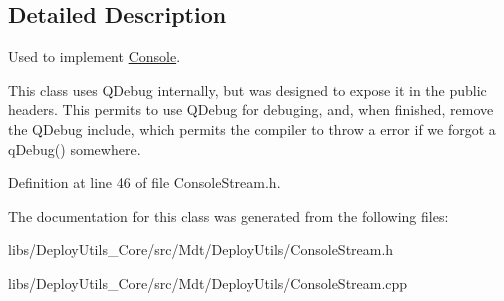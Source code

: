 \subsection{Detailed Description}
Used to implement \hyperlink{class_mdt_1_1_deploy_utils_1_1_console}{Console}. 

This class uses Q\+Debug internally, but was designed to expose it in the public headers. This permits to use Q\+Debug for debuging, and, when finished, remove the Q\+Debug include, which permits the compiler to throw a error if we forgot a q\+Debug() somewhere. 

Definition at line 46 of file Console\+Stream.\+h.



The documentation for this class was generated from the following files\+:\begin{DoxyCompactItemize}
\item 
libs/\+Deploy\+Utils\+\_\+\+Core/src/\+Mdt/\+Deploy\+Utils/Console\+Stream.\+h\item 
libs/\+Deploy\+Utils\+\_\+\+Core/src/\+Mdt/\+Deploy\+Utils/Console\+Stream.\+cpp\end{DoxyCompactItemize}
